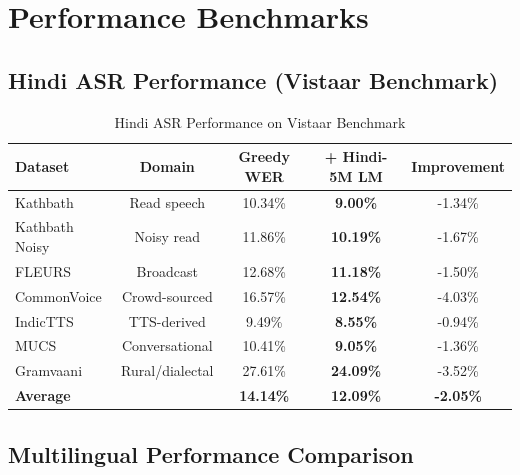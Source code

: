 \documentclass[12pt,a4paper]{article}
\begin{document}
\section{Performance Benchmarks}

\subsection{Hindi ASR Performance (Vistaar Benchmark)}

\begin{table}[h]
\centering
\caption{Hindi ASR Performance on Vistaar Benchmark}
\begin{tabular}{@{}lcccc@{}}
\toprule
\textbf{Dataset} & \textbf{Domain} & \textbf{Greedy WER} & \textbf{+ Hindi-5M LM} & \textbf{Improvement} \\
\midrule
Kathbath & Read speech & 10.34\% & \textbf{9.00\%} & -1.34\% \\
Kathbath Noisy & Noisy read & 11.86\% & \textbf{10.19\%} & -1.67\% \\
FLEURS & Broadcast & 12.68\% & \textbf{11.18\%} & -1.50\% \\
CommonVoice & Crowd-sourced & 16.57\% & \textbf{12.54\%} & -4.03\% \\
IndicTTS & TTS-derived & 9.49\% & \textbf{8.55\%} & -0.94\% \\
MUCS & Conversational & 10.41\% & \textbf{9.05\%} & -1.36\% \\
Gramvaani & Rural/dialectal & 27.61\% & \textbf{24.09\%} & -3.52\% \\
\midrule
\textbf{Average} & & \textbf{14.14\%} & \textbf{12.09\%} & \textbf{-2.05\%} \\
\bottomrule
\end{tabular}
\end{table}

\subsection{Multilingual Performance Comparison}
\end{document}
